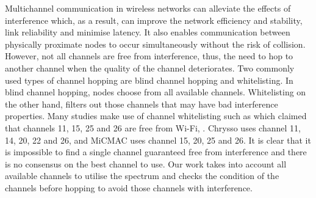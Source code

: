 Multichannel communication in wireless networks can alleviate the effects of interference which, as a result, can improve the network efficiency and stability, link reliability and minimise latency. It also enables communication between physically proximate nodes to occur simultaneously without the risk of collision. However, not all channels are free from interference, thus, the need to hop to another channel when the quality of the channel deteriorates. Two commonly used types of channel hopping \cite{watteyne} are blind channel hopping and whitelisting. In blind channel hopping, nodes choose from all available channels. Whitelisting on the other hand, filters out those channels that may have bad interference properties. Many studies make use of channel whitelisting such as \cite{watteyne} which claimed that channels 11, 15, 25 and 26 are free from Wi-Fi, \cite{wu}. Chrysso \cite{chrysso} uses channel 11, 14, 20, 22 and 26, and MiCMAC \cite{micmac} uses channel 15, 20, 25 and 26. It is clear that it 
is impossible to find a single channel guaranteed free from interference and there is no consensus on the best channel to use. Our work takes into account all available channels to utilise the spectrum and checks the condition of the channels before hopping to avoid those channels with interference.





